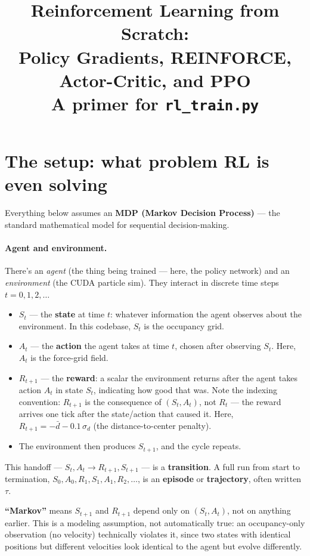 \documentclass[11pt]{article}
\title{Reinforcement Learning from Scratch:\\
Policy Gradients, REINFORCE, Actor-Critic, and PPO\\
\large A primer for \texttt{rl\_train.py}}
\author{}
\date{}
\begin{document}
\maketitle

\section*{The setup: what problem RL is even solving}

Everything below assumes an \textbf{MDP (Markov Decision Process)} --- the standard
mathematical model for sequential decision-making.

\paragraph{Agent and environment.} There's an \emph{agent} (the thing being trained ---
here, the policy network) and an \emph{environment} (the CUDA particle sim). They interact
in discrete time steps $t = 0, 1, 2, \dots$

\begin{itemize}
  \item $S_t$ --- the \textbf{state} at time $t$: whatever information the agent observes
  about the environment. In this codebase, $S_t$ is the occupancy grid.
  \item $A_t$ --- the \textbf{action} the agent takes at time $t$, chosen after observing
  $S_t$. Here, $A_t$ is the force-grid field.
  \item $R_{t+1}$ --- the \textbf{reward}: a scalar the environment returns after the agent
  takes action $A_t$ in state $S_t$, indicating how good that was. Note the indexing
  convention: $R_{t+1}$ is the consequence of $(S_t, A_t)$, not $R_t$ --- the reward arrives
  one tick after the state/action that caused it. Here,
  $R_{t+1} = -\bar d - 0.1\,\sigma_d$ (the distance-to-center penalty).
  \item The environment then produces $S_{t+1}$, and the cycle repeats.
\end{itemize}

This handoff --- $S_t, A_t \to R_{t+1}, S_{t+1}$ --- is a \textbf{transition}. A full run
from start to termination, $S_0, A_0, R_1, S_1, A_1, R_2, \dots$, is an \textbf{episode} or
\textbf{trajectory}, often written $\tau$.

\textbf{``Markov''} means $S_{t+1}$ and $R_{t+1}$ depend only on $(S_t, A_t)$, not on
anything earlier. This is a modeling assumption, not automatically true: an occupancy-only
observation (no velocity) technically violates it, since two states with identical
positions but different velocities look identical to the agent but evolve differently.
\end{document}
